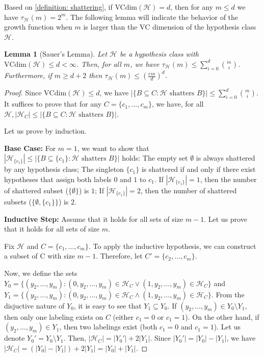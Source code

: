\documentclass[openany, amssymb, psamsfonts]{amsart}
\newtheorem{lem}{Lemma}[section]
\theoremstyle{definition}
\numberwithin{equation}{section}
\begin{document}
Based on \autoref{definition: shattering}, if VCdim$(\mathcal{H}) = d$, then for any $m \leq d$ we have $\tau_{\mathcal{H}}(m) = 2^m$. The following lemma will indicate the behavior of the growth function when $m$ is larger than the VC dimension of the hypothesis class $\mathcal{H}$.

\begin{lem}[Sauer's Lemma\cite{Sauer1972}]\label{lemma: Sauer}
Let $\mathcal{H}$ be a hypothesis class with $\mathrm{VCdim}(\mathcal{H}) \leq d < \infty$. Then, for all $m$, we have $\tau_{\mathcal{H}}(m) \leq \sum_{i=0}^{d} \binom{m}{i}$. Furthermore, if $m \geq d + 2$ then $\tau_{\mathcal{H}}(m) \leq (\frac{em}{d})^{d}$.
\end{lem}
\begin{proof}
Since $\mathrm{VCdim}(\mathcal{H}) \leq d$, we have $|\{B\subseteq C\colon \mathcal{H} \text{ shatters } B\}|\leq \sum_{i=0}^{d} \binom{m}{i}$.
It suffices to prove that for any $C=\{c_1, \ldots ,c_m\}$, we have, for all $\mathcal{H}, |\mathcal{H}_C|\leq|\{B\subseteq C\colon \mathcal{H} \text{ shatters } B\}|$.

Let us prove by induction.

\textbf{Base Case:} For $m=1$, we want to show that $|\mathcal{H}_{\{c_1\}}|\leq |\{B\subseteq\{c_1\}\colon\mathcal{H} \text{ shatters } B\}|$ holds: The empty set $\emptyset$ is always shattered by any hypothesis class; The singleton $\{c_1\}$ is shattered if and only if there exist hypotheses that assign both labels $0$ and $1$ to $c_1$. If $|\mathcal{H}_{\{c_1\}}| = 1$, then the number of shattered subset ($\{\emptyset\}$) is $1$; If $|\mathcal{H}_{\{c_1\}}| = 2$, then the number of shattered subsets ($\{\emptyset, \{c_1\}\}$) is $2$.

\textbf{Inductive Step:} Assume that it holds for all sets of size $m-1$. Let us prove that it holds for all sets of size $m$.

Fix $\mathcal{H}$ and $C=\{c_1,\ldots, c_m\}$. To apply the inductive hypothesis, we can construct a subset of C with size $m-1$. Therefore, let $C'=\{c_2,\ldots, c_m\}$.

Now, we define the sets $Y_0 = \{(y_2, \ldots, y_m) : (0, y_2, \ldots, y_m) \in \mathcal{H}_C \lor (1, y_2, \ldots, y_m) \in \mathcal{H}_C\}$ and $Y_1 = \{(y_2, \ldots, y_m) : (0, y_2, \ldots, y_m) \in \mathcal{H}_C \land (1, y_2, \ldots, y_m) \in \mathcal{H}_C\}$.
From the disjuctive nature of $Y_0$, it is easy to see that $Y_1\subseteq Y_0$. If $(y_2, \ldots, y_m) \in Y_0 \setminus Y_1$, then only one labeling exists on $C$ (either $c_1 = 0$ or $c_1 = 1$). On the other hand, if $(y_2, \ldots, y_m) \in Y_1$, then two labelings exist (both $c_1 = 0$ and $c_1 = 1$). Let us denote $Y_0' = Y_0 \setminus Y_1$. Then, $|\mathcal{H}_C| = |Y_0'| + 2|Y_1|$. Since $|Y_0'| = |Y_0| - |Y_1|$, we have $|\mathcal{H}_C| = (|Y_0| - |Y_1|) + 2|Y_1| = |Y_0| + |Y_1|$.


\end{proof}
\end{document}
